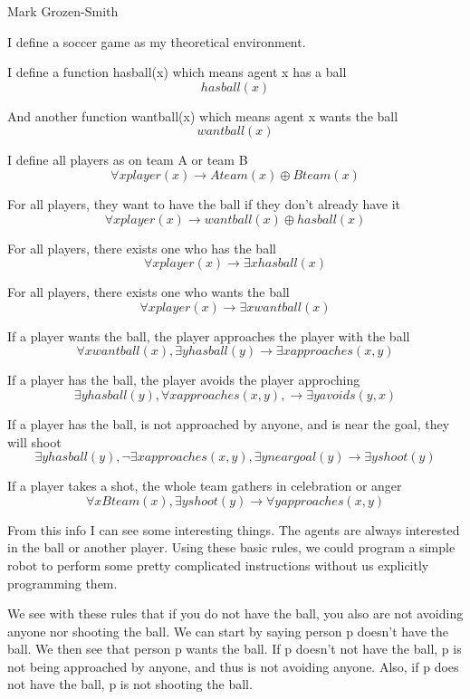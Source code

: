 \documentclass[11pt]{article}
\begin{document}
 \hfill Mark Grozen-Smith

\bigskip

	I define a soccer game as my theoretical environment.

	I define a function hasball(x) which means agent x has a ball 
	$$ hasball(x)$$

	And another function wantball(x) which means agent x wants the ball
	$$ wantball(x)$$

	I define all players as on team A or team B
	$$ \forall x player(x) \rightarrow Ateam(x) \oplus Bteam(x) $$

	For all players, they want to have the ball if they don't already have it
	$$ \forall x player(x) \rightarrow wantball(x) \oplus hasball(x) $$

	For all players, there exists one who has the ball
	$$ \forall x player(x) \rightarrow \exists x hasball(x)$$

	For all players, there exists one who wants the ball
	$$ \forall x player(x) \rightarrow \exists x wantball(x)$$

	If a player wants the ball, the player approaches the player with the ball
	$$ \forall x wantball(x), \exists y hasball(y) \rightarrow \exists x approaches(x,y)$$

	If a player has the ball, the player avoids the player approching
	$$ \exists y hasball(y), \forall x approaches(x,y), \rightarrow \exists y avoids(y,x)$$

	If a player has the ball, is not approached by anyone, and is near the goal, they will shoot
	$$ \exists y hasball(y), \neg \exists x approaches(x,y), \exists y neargoal(y) \rightarrow \exists y shoot(y) $$

	If a player takes a shot, the whole team gathers in celebration or anger
	$$ \forall x Bteam(x), \exists y shoot(y) \rightarrow \forall y approaches(x,y)  $$

	From this info I can see some interesting things. The agents are always interested in the ball or another player.  Using these basic rules, we could program a simple robot to perform some pretty complicated instructions without us explicitly programming them. 

	We see with these rules that if you do not have the ball, you also are not avoiding anyone nor shooting the ball.  We can start by saying person p doesn't have the ball.  We then see that person p wants the ball.  If p doesn't not have the ball, p is not being approached by anyone, and thus is not avoiding anyone. Also, if p does not have the ball, p is not shooting the ball. 
\end{document}
